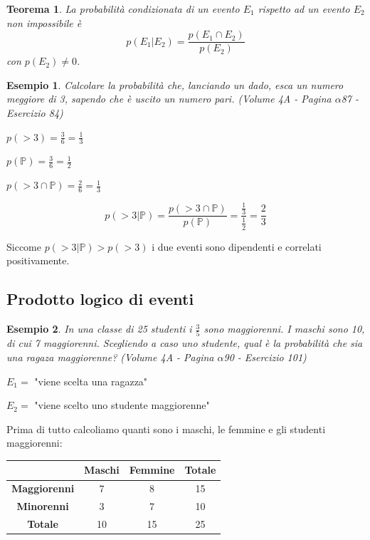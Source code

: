 \documentclass{article}     %
\newtheorem*{theorem}{Teorema}
\newtheorem{ex}{Esempio}[section]
\begin{document}
                \begin{theorem}
                    La probabilità condizionata di un evento $E_1$ rispetto ad un evento $E_2$ non impossibile è \[p(E_1|E_2)=\frac{p(E_1\cap E_2)}{p(E_2)}\]
                    con $p(E_2)\neq 0$.
                \end{theorem}

                \begin{ex}
                    Calcolare la probabilità che, lanciando un dado, esca un numero meggiore di 3, sapendo che è uscito un numero pari.
                    (Volume 4A - Pagina $\alpha$87 - Esercizio 84)
                \end{ex}
                $p(>3)=\frac{3}{6}=\frac{1}{3}$

                $p(\mathbb{P})=\frac{3}{6}=\frac{1}{2}$

                $p(>3\cap\mathbb{P})=\frac{2}{6}=\frac{1}{3}$

                \[p(>3|\mathbb{P})=\frac{p(>3\cap\mathbb{P})}{p(\mathbb{P})}=\frac{\frac{1}{3}}{\frac{1}{2}}=\frac{2}{3}\]

                Siccome $p(>3|\mathbb{P})>p(>3)$ i due eventi sono dipendenti e correlati positivamente.

            \subsection{Prodotto logico di eventi}
                \begin{ex}
                    In una classe di 25 studenti i $\frac{3}{5}$ sono maggiorenni. I maschi sono 10, di cui 7 maggiorenni. Scegliendo a caso uno studente, qual è la probabilità che sia una ragaza maggiorenne? (Volume 4A - Pagina $\alpha$90 - Esercizio 101)
                \end{ex}
                
                $E_1 =$ "viene scelta una ragazza"

                $E_2 = $ "viene scelto uno studente maggiorenne"

                Prima di tutto calcoliamo quanti sono i maschi, le femmine e gli studenti maggiorenni:
                
                \begin{tabular}{|c|c|c|c|}
                    \hline 
                    & \textbf{Maschi} & \textbf{Femmine} & \textbf{Totale}\\ \hline 
                    \textbf{Maggiorenni} & 7 & 8 & 15\\ \hline
                    \textbf{Minorenni} & 3 & 7 & 10\\ \hline
                    \textbf{Totale} & 10 & 15 & 25\\ \hline
                \end{tabular}
\end{document}
